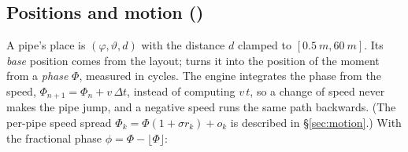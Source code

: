 \subsection{Positions and motion ()}
\label{sec:math-motion}
A pipe's place is $(\varphi,\vartheta,d)$ with the distance $d$ clamped to $[\SI{0.5}{m},\SI{60}{m}]$. Its
\emph{base} position comes from the layout;  turns it into the position of the moment from a
\emph{phase} $\Phi$, measured in cycles. The engine integrates the phase from the speed, $\Phi_{n+1} = \Phi_n +
v\,\Delta t$, instead of computing $v\,t$, so a change of speed never makes the pipe jump, and a negative speed runs
the same path backwards. (The per-pipe speed spread $\Phi_k = \Phi(1+\sigma r_k)+o_k$ is described in
\S\ref{sec:motion}.) With the fractional phase $\phi = \Phi - \lfloor\Phi\rfloor$:

